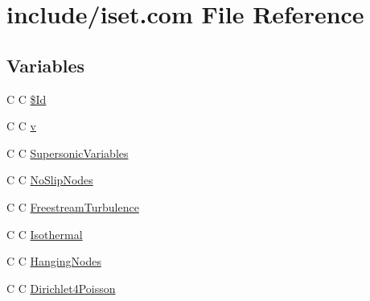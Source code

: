 \hypertarget{iset_8com}{\section{include/iset.com File Reference}
\label{iset_8com}
}
\subsection*{Variables}
\begin{DoxyCompactItemize}
\item 
C C \hyperlink{iset_8com_af40bd3a96fc1553c00422342f92046b8}{\$\-Id}
\item 
C C \hyperlink{iset_8com_a8961853e9a171af64fe80e35da93a2e0}{v}
\item 
C C \hyperlink{iset_8com_a131f45166cf872751c6da9ea139f4eb9}{Supersonic\-Variables}
\item 
C C \hyperlink{iset_8com_ac1d33155ed4ab764fc97a894f12d539a}{No\-Slip\-Nodes}
\item 
C C \hyperlink{iset_8com_a379b1077bcd35b438752d148755f81b4}{Freestream\-Turbulence}
\item 
C C \hyperlink{iset_8com_a48a8ea7f5924d8931fef20b19e99c850}{Isothermal}
\item 
C C \hyperlink{iset_8com_ab153707b02904676033ef6493c94bdee}{Hanging\-Nodes}
\item 
C C \hyperlink{iset_8com_afafa7c1b85400faa7d80cd517d4b8b11}{Dirichlet4\-Poisson}
\end{DoxyCompactItemize}


